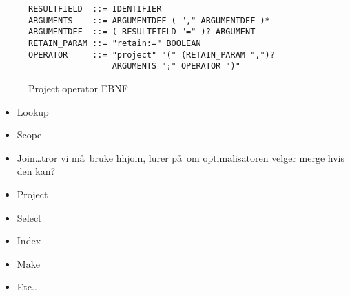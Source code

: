 \begin{figure}[!h]
\centering
\begin{Verbatim}
RESULTFIELD  ::= IDENTIFIER
ARGUMENTS    ::= ARGUMENTDEF ( "," ARGUMENTDEF )*
ARGUMENTDEF  ::= ( RESULTFIELD "=" )? ARGUMENT
RETAIN_PARAM ::= "retain:=" BOOLEAN
OPERATOR     ::= "project" "(" (RETAIN_PARAM ",")? 
                 ARGUMENTS ";" OPERATOR ")"
\end{Verbatim}
\caption{Project operator EBNF}
\label{figure:mql:ebnf:project_ebnf}
\end{figure}





\begin{itemize}
  \item Lookup
  \item Scope
  \item Join\ldots tror vi m\aa~bruke hhjoin, lurer p\aa~om optimalisatoren velger merge hvis den kan?
  \item Project
  \item Select
  \item Index
  \item Make
  \item Etc..
\end{itemize}

